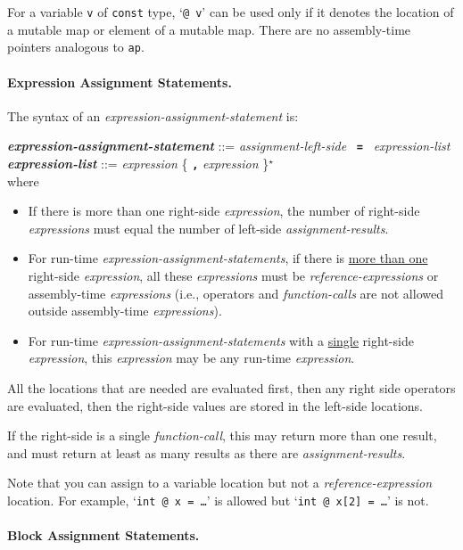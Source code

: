\documentclass[12pt]{article}
\newcommand{\subsubsubsection}[1]{\paragraph[#1]{#1.}}
\newcommand{\TT}[1]{{\tt \bfseries #1}}
\newcommand{\STAR}{{\Large $^\star$}}
\newcommand{\emkey}[1]{{\em \bfseries #1}}
\newenvironment{indpar}[1][0.3in]%
	{\begin{list}{}%
		     {\setlength{\itemsep}{0in}%
		      \setlength{\topsep}{0in}%
		      \setlength{\parsep}{1ex}%
		      \setlength{\labelwidth}{#1}%
		      \setlength{\leftmargin}{#1}%
		      \addtolength{\leftmargin}{\labelsep}}%
	 \item}%
	{\end{list}}
\begin{document}
For a variable {\tt v} of {\tt const} type, `{\tt @ v}'
can be used only if it denotes the location of a mutable map or
element of a mutable map.
There are no assembly-time pointers analogous to {\tt ap}.

\subsubsubsection{Expression Assignment Statements}
\label{EXPRESSION-ASSIGNMENT-STATEMENTS}

The syntax of an {\em expression-assign\-ment-statement} is:
\begin{indpar}
\emkey{expression-assignment-statement} ::=
    {\em assignment-left-side} ~\TT{=}~ {\em expression-list}
\\[0.5ex]
\emkey{expression-list}\label{EXPRESSION-LIST} ::=
	      {\em expression} \{ \TT{,} {\em expression} \}\STAR{}
\\[2.0ex]
where
\begin{itemize}
\item If there is more than one right-side {\em expression},
the number of right-side {\em expressions} must equal the number
of left-side {\em assignment-results}.
\item For run-time {\em expression-assignment-statements}, if
there is \underline{more than one} right-side {\em expression}, all these
{\em expressions} must be {\em reference-expressions} or
assembly-time {\em expressions} (i.e., operators and
{\em function-calls} are not allowed outside assem\-bly-time
{\em expressions}).
\item For run-time {\em expression-assignment-statements} with
a \underline{single} right-side {\em expression}, this {\em expression}
may be any run-time {\em expression}.
\end{itemize}
\end{indpar}

All the locations that are needed are evaluated first, then any right
side operators are evaluated, then the right-side values are stored
in the left-side locations.

If the right-side is a single {\em function-call},
this may return more than one result, and must return
at least as many results as there are {\em assignment-results}.

Note that you can assign to a variable location but not a
{\em reference-expression} location.  For example, `{\tt int @ x = \ldots}'
is allowed but `{\tt int @ x[2] = \ldots}' is not.



\subsubsubsection{Block Assignment Statements}
\label{BLOCK-ASSIGNMENT-STATEMENTS}
\end{document}
